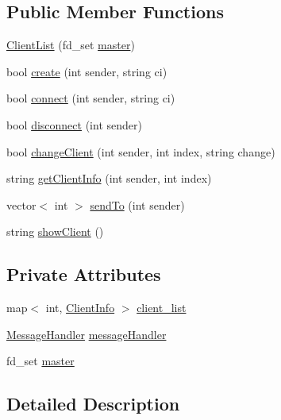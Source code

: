 \subsection*{Public Member Functions}
\begin{DoxyCompactItemize}
\item 
\hyperlink{class_client_list_a78d1f60f3a818066df0da1d868c6776e}{Client\+List} (fd\+\_\+set \hyperlink{class_client_list_a819f5455b1afa484d846d5b6ef4209a7}{master})
\item 
bool \hyperlink{class_client_list_addcac03e71cbdbbb7fbf878f5c88cc98}{create} (int sender, string ci)
\item 
bool \hyperlink{class_client_list_a005bf6c281313258e0a4ca42a7155f7f}{connect} (int sender, string ci)
\item 
bool \hyperlink{class_client_list_abbd18177e7004dec854a32b2fd47461b}{disconnect} (int sender)
\item 
bool \hyperlink{class_client_list_aa3e5dedccb72e114e7501bfa21939b1e}{change\+Client} (int sender, int index, string change)
\item 
string \hyperlink{class_client_list_a6c3d393ac36a1227dab58228b696ac4c}{get\+Client\+Info} (int sender, int index)
\item 
vector$<$ int $>$ \hyperlink{class_client_list_a260ee1c56cb4472c240839875c3bdf78}{send\+To} (int sender)
\item 
string \hyperlink{class_client_list_a1d7694b77ac65472acc2e7fed05da544}{show\+Client} ()
\end{DoxyCompactItemize}
\subsection*{Private Attributes}
\begin{DoxyCompactItemize}
\item 
map$<$ int, \hyperlink{class_client_info}{Client\+Info} $>$ \hyperlink{class_client_list_a53c73362bff032aa6fceab4b8b5b39de}{client\+\_\+list}
\item 
\hyperlink{class_message_handler}{Message\+Handler} \hyperlink{class_client_list_a15fd10297f79e0d1278d3b106c715390}{message\+Handler}
\item 
fd\+\_\+set \hyperlink{class_client_list_a819f5455b1afa484d846d5b6ef4209a7}{master}
\end{DoxyCompactItemize}


\subsection{Detailed Description}


